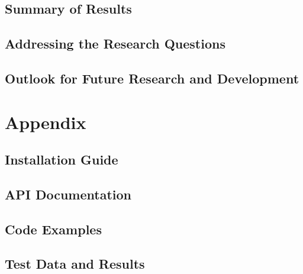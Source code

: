 \documentclass{article}
\begin{document}
\subsection{Summary of Results}
\subsection{Addressing the Research Questions}
\subsection{Outlook for Future Research and Development}

\newpage

\newpage

\appendix
\section*{Appendix}
\subsection*{Installation Guide}
\subsection*{API Documentation}
\subsection*{Code Examples}
\subsection*{Test Data and Results}



\end{document}
